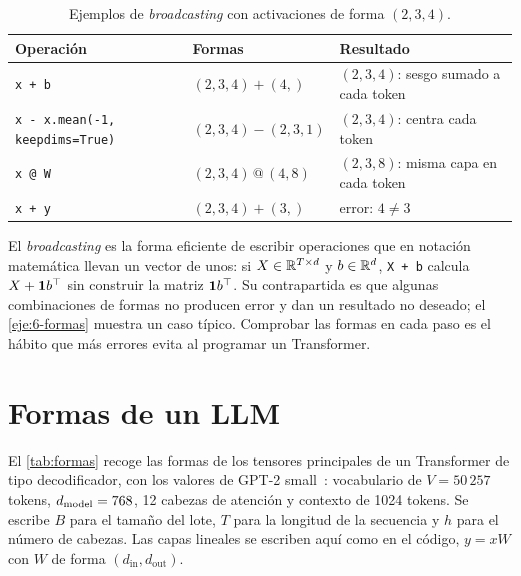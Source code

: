 \begin{table}[h]
\centering\small
\caption{Ejemplos de \emph{broadcasting} con activaciones de forma $(2,3,4)$.}\label{tab:broadcasting}
\begin{tabular}{@{}lll@{}}
\toprule
Operación & Formas & Resultado \\
\midrule
\texttt{x + b} & $(2,3,4)+(4,)$ & $(2,3,4)$: sesgo sumado a cada token \\
\texttt{x - x.mean(-1, keepdims=True)} & $(2,3,4)-(2,3,1)$ & $(2,3,4)$: centra cada token \\
\texttt{x @ W} & $(2,3,4)\,@\,(4,8)$ & $(2,3,8)$: misma capa en cada token \\
\texttt{x + y} & $(2,3,4)+(3,)$ & error: $4\ne 3$ \\
\bottomrule
\end{tabular}
\end{table}

\begin{observacion}
El \emph{broadcasting} es la forma eficiente de escribir operaciones que en notación matemática llevan un vector de unos: si $X\in\mathbb{R}^{T\times d}$ y $b\in\mathbb{R}^{d}$, \texttt{X + b} calcula $X+\mathbf{1}b^{\top}$ sin construir la matriz $\mathbf{1}b^{\top}$. Su contrapartida es que algunas combinaciones de formas no producen error y dan un resultado no deseado; el \cref{eje:6-formas} muestra un caso típico. Comprobar las formas en cada paso es el hábito que más errores evita al programar un Transformer.
\end{observacion}

\section{Formas de un LLM}

El \cref{tab:formas} recoge las formas de los tensores principales de un Transformer de tipo decodificador, con los valores de GPT-2 small~\cite{gpt2}: vocabulario de $V=50\,257$ tokens, $d_{\mathrm{model}}=768$, 12 cabezas de atención y contexto de 1024 tokens. Se escribe $B$ para el tamaño del lote, $T$ para la longitud de la secuencia y $h$ para el número de cabezas. Las capas lineales se escriben aquí como en el código, $y=xW$ con $W$ de forma $(d_{\text{in}},d_{\text{out}})$.


